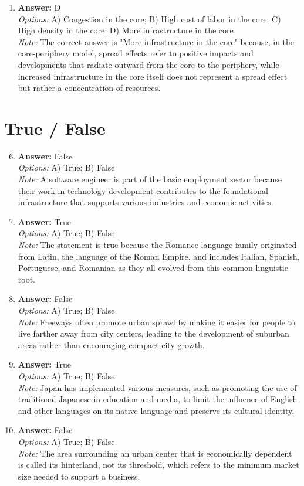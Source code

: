 \documentclass[12pt]{article}
\begin{document}
\begin{enumerate}[label=\arabic*.]
\item \textbf{Answer:} D
\\ \textit{Options:} A) Congestion in the core; B) High cost of labor in the core; C) High density in the core; D) More infrastructure in the core
\\ \textit{Note:} The correct answer is "More infrastructure in the core" because, in the core-periphery model, spread effects refer to positive impacts and developments that radiate outward from the core to the periphery, while increased infrastructure in the core itself does not represent a spread effect but rather a concentration of resources.
\end{enumerate}

\section*{True / False}
\begin{enumerate}[label=\arabic*.]
\setcounter{enumi}{5}
\item \textbf{Answer:} False
\\ \textit{Options:} A) True; B) False
\\ \textit{Note:} A software engineer is part of the basic employment sector because their work in technology development contributes to the foundational infrastructure that supports various industries and economic activities.
\item \textbf{Answer:} True
\\ \textit{Options:} A) True; B) False
\\ \textit{Note:} The statement is true because the Romance language family originated from Latin, the language of the Roman Empire, and includes Italian, Spanish, Portuguese, and Romanian as they all evolved from this common linguistic root.
\item \textbf{Answer:} False
\\ \textit{Options:} A) True; B) False
\\ \textit{Note:} Freeways often promote urban sprawl by making it easier for people to live farther away from city centers, leading to the development of suburban areas rather than encouraging compact city growth.
\item \textbf{Answer:} True
\\ \textit{Options:} A) True; B) False
\\ \textit{Note:} Japan has implemented various measures, such as promoting the use of traditional Japanese in education and media, to limit the influence of English and other languages on its native language and preserve its cultural identity.
\item \textbf{Answer:} False
\\ \textit{Options:} A) True; B) False
\\ \textit{Note:} The area surrounding an urban center that is economically dependent is called its hinterland, not its threshold, which refers to the minimum market size needed to support a business.
\end{enumerate}
\end{document}
